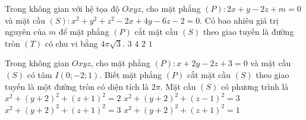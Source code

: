 \begin{ex}%
	Trong không gian với hệ tọa độ $Oxyz$, cho mặt phẳng $(P):2x+y-2z+m=0$ và mặt cầu $(S):x^2+y^2+z^2-2x+4y-6z-2=0$. Có bao nhiêu giá trị nguyên của  $m$ để mặt phẳng $(P)$ cắt mặt cầu $(S)$ theo giao tuyến là đường tròn $(T)$ có chu vi bằng $4\pi \sqrt{3}$. 
	\choice
	{$3$}
	{$4$}
	{\True $2$}
	{$1$}
\end{ex}
\begin{ex}%
	Trong không gian $Oxyz$, cho mặt phẳng $(P)\colon x+2y-2z+3=0$ và mặt cầu $(S)$ có tâm $I(0;-2;1)$. Biết mặt phẳng $(P)$ cắt mặt cầu $(S)$ theo giao tuyến là một đường tròn có diện tích là $2\pi $. Mặt cầu $(S)$ có phương trình là
	\choice
	{$x^2+(y+2)^2+(z+1)^2=2$}
	{\True $x^2+(y+2)^2+(z-1)^2=3$}
	{$x^2+(y+2)^2+(z+1)^2=3$}
	{$x^2+(y+2)^2+(z+1)^2=1$}
\end{ex}
